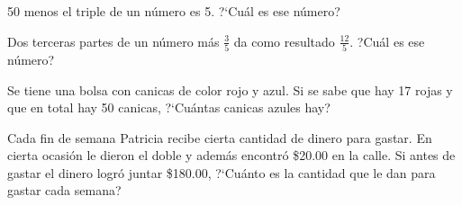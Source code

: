 \documentclass[11pt]{article}
\begin{document}
\vspace{2cm}
50 menos el triple de un n\'umero es 5. ?`Cu\'al es ese n\'umero?

\vspace{2cm}
Dos terceras partes de un n\'umero m\'as $\frac{3}{5}$ da como resultado
$\frac{12}{5}$. ?Cu\'al es ese n\'umero?

\vspace{2cm}
Se tiene una bolsa con canicas de color rojo y azul. Si se sabe que hay 17 rojas
y que en total hay 50 canicas, ?`Cu\'antas canicas azules hay?

\vspace{2cm}
Cada fin de semana Patricia recibe cierta cantidad de dinero para gastar. En
cierta ocasi\'on le dieron el doble y adem\'as encontr\'o \$20.00 en la calle.
Si antes de gastar el dinero logr\'o juntar \$180.00, ?`Cu\'anto es la cantidad
que le dan para gastar cada semana?
\end{document}
